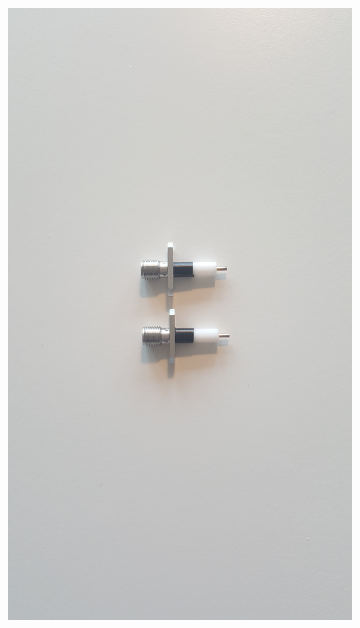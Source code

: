 \documentclass[main.tex]{subfiles}
\begin{document}
\begin{figure}[h]
    \centering
    \begin{subfigure}{0.25\textwidth}
        \centering
        \includegraphics[angle=-90,trim=1450 100 1550 100,clip,width=0.97\linewidth]{figure/Filterbilder/f_sma_skalning.jpg} 
        \caption{}
        \label{fig:f_SMA_skalning}
    \end{subfigure}

\end{figure}
\end{document}
